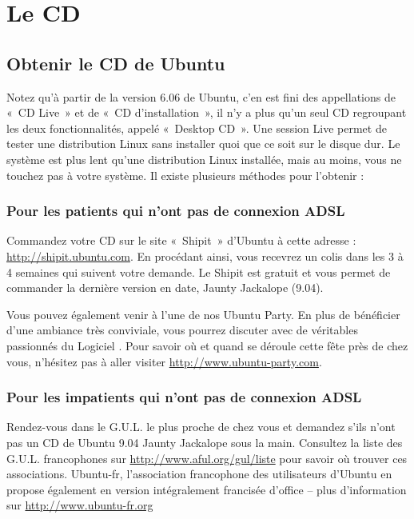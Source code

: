 \section{Le CD}
\subsection{Obtenir le CD de Ubuntu}
Notez qu'à partir de la version 6.06 de Ubuntu, c'en est fini des appellations de «~CD Live~» et de «~CD d'installation~», il n'y a plus qu'un seul CD regroupant les deux fonctionnalités, appelé «~Desktop CD~». Une session Live permet de tester une distribution Linux sans installer quoi que ce soit sur le disque dur. Le système est plus lent qu'une distribution Linux installée, mais au moins, vous ne touchez pas à votre système. Il existe plusieurs méthodes pour l'obtenir :
\subsubsection{Pour les patients qui n'ont pas de connexion ADSL}
Commandez votre CD sur le site «~Shipit~» d'Ubuntu à cette adresse : \url{http://shipit.ubuntu.com}. En procédant ainsi, vous recevrez un colis dans les 3 à 4 semaines qui suivent votre demande. Le Shipit est gratuit et vous permet de commander %
 la dernière version en date, Jaunty Jackalope (9.04).\par
Vous pouvez également venir à l'une de nos Ubuntu Party. En plus de bénéficier d'une ambiance très conviviale, vous pourrez discuter avec de véritables passionnés du Logiciel . Pour savoir où et quand se déroule cette fête près de chez vous, n'hésitez pas à aller visiter \url{http://www.ubuntu-party.com}.
\subsubsection{Pour les impatients qui n'ont pas de connexion ADSL}
Rendez-vous dans le G.U.L. le plus proche de chez vous et demandez s'ils n'ont pas un CD de Ubuntu 9.04 Jaunty Jackalope sous la main. Consultez la liste des G.U.L. francophones sur \url{http://www.aful.org/gul/liste} pour savoir où trouver ces associations. Ubuntu-fr, l'association francophone des utilisateurs d'Ubuntu en propose également en version intégralement francisée d'office -- plus d'information sur \url{http://www.ubuntu-fr.org}
